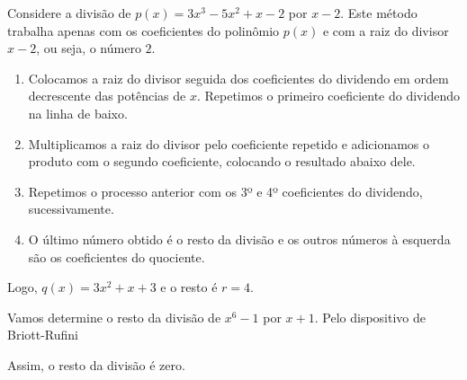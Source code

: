 \begin{exem}
    Considere a divisão de $p(x)=3x^3-5x^2+x-2$ por $x-2$. Este método trabalha apenas com os coeficientes do polinômio $p(x)$ e com a raiz do divisor $x-2$, ou seja, o número $2$.

    \begin{enumerate}
        \item Colocamos a raiz do divisor seguida dos coeficientes do dividendo em ordem decrescente das potências de $x$. Repetimos o primeiro coeficiente do dividendo na linha de baixo.
        \begin{center}
        \end{center}

        \item  Multiplicamos a raiz do divisor pelo coeficiente repetido e adicionamos o produto com o segundo coeficiente, colocando o resultado abaixo dele.
        \begin{center}
        \end{center}

        \item Repetimos o processo anterior com os 3º e 4º coeficientes do dividendo, sucessivamente.
        \begin{center}
            \hspace{2cm}
        \end{center}

        \item O último número obtido é o resto da divisão e os outros números à esquerda são os coeficientes do quociente.
        \begin{center}
        \end{center}
    \end{enumerate}
    
    Logo, $q(x)=3x^2+x+3$ e o resto é $r=4$.
\end{exem}

\begin{exem}
    Vamos determine o resto da divisão de $x^6-1$ por $x+1$. Pelo dispositivo de Briott-Rufini
    \begin{center}
        \end{center}

    Assim, o resto da divisão é zero.
\end{exem}


